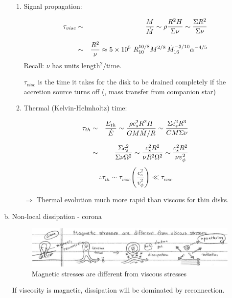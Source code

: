 \begin{enumerate}[a)]
\begin{enumerate}[1)]
   \item Signal propagation:
   
\begin{eqnarray}
   \tau_{visc} &\sim& \frac{M}{\dot{M}} \sim \rho \frac{R^{2}H}{\Sigma \nu} \sim \frac{\Sigma R^{2}}{\Sigma \nu} \nonumnext
               &\sim& \frac{R^{2}}{\nu} \approx 5\times 10^5 ~ R_{10}^{10/8} M^{2/8}\, \dot{M}_{16}^{-3/10} \alpha^{-4/5}
\end{eqnarray}
Recall: $\nu$ has units length$^2$/time.

$\tau_{visc}$ is the time it takes for the disk to be drained completely if the accretion source turns off
(\eg, mass transfer from companion star)

   \item Thermal (Kelvin-Helmholtz) time:

\begin{eqnarray}
   \tau_{th} &\sim& \frac{E_{th}}{\dot{E}} \sim \frac{\rho c_{s}^{2} R^{2} H}{GM\dot{M}/R} \sim \frac{\Sigma c_{s}^{2}R^{3}}{CM\Sigma \nu} \nonumnext
             &\sim& \frac{\Sigma c_{s}^{2}}{\Sigma \nu \Omega^{2}} \sim \frac{c_{s}^{2}R^{2}}{\nu R^{2}\Omega^{2}} \sim \frac{c_{s}^{2} R^{2}}{\nu v_{\phi}^2}
\end{eqnarray}
\begin{equation}
   \therefore \tau_{th} \sim \tau_{visc} \left( \frac{c_{s}^{2}}{v_{\phi}^{2}} \right) \ll \tau_{visc}
\end{equation}

$\Rightarrow$ Thermal evolution much more rapid than viscous for thin disks.
\end{enumerate}

   \item Non-local dissipation - corona

\begin{figure}[!htbp]
   \centering
   \includegraphics[width=\textwidth]{HighEnergy/note01}
   \caption{Magnetic stresses are different from viscous stresses}
\end{figure}

If viscosity is magnetic, dissipation will be dominated by reconnection.


\end{enumerate}
